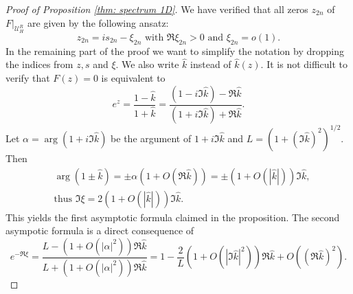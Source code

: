 \documentclass{amsart}
\newcommand{\abs}[1]{\left|#1\right|}
\newcommand{\Ueps}{{\mathcal{U}_H^R}}
\newcommand{\khat}{\hat{k}}
\begin{document}
\begin{proof}[Proof of Proposition \ref{thm: spectrum 1D}]
 We have verified that all zeros $z_{2n}$ of $F|_\Ueps$ are given by the following ansatz:
 \begin{equation}\nonumber
  z_{2n} = is_{2n} - \xi_{2n} \text{ with } \Re\xi_{2n}>0 \text{ and } \xi_{2n} = o(1).
 \end{equation}
 In the remaining part of the proof we want to simplify the notation by dropping the indices from $z, s$ and $\xi$. We also write $\khat$ instead of $\khat(z)$. It is not difficult to verify that $F(z)=0$ is equivalent to 
 \begin{equation}\nonumber
  e^z = \frac{1-\khat}{1+\khat} = \frac{(1-i\Im\khat) - \Re\khat}{(1+i\Im\khat) + \Re\khat}.
 \end{equation}
 Let $\alpha=\arg(1+i\Im\khat)$ be the argument of $1+i\Im\khat$ and $L=(1+(\Im\khat)^2)^{1/2}$. Then
 \begin{align*}
  &\arg(1\pm\khat) = \pm \alpha (1+O(\Re\khat)) = \pm (1+O(|\khat|))\Im\khat, \\
  &\text{thus } \Im \xi = 2(1+O(|\khat|))\Im\khat.
 \end{align*}
 This yields the first asymptotic formula claimed in the proposition. The second asympotic formula is a direct consequence of
 \begin{equation}\nonumber
  e^{-\Re\xi} = \frac{L-(1+O(\abs{\alpha}^2))\Re\khat}{L+(1+O(\abs{\alpha}^2))\Re\khat} = 1 - \frac{2}{L}(1+O(|\Im\khat|^2))\Re\khat + O((\Re\khat)^2).
 \end{equation}
\end{proof}
\end{document}

